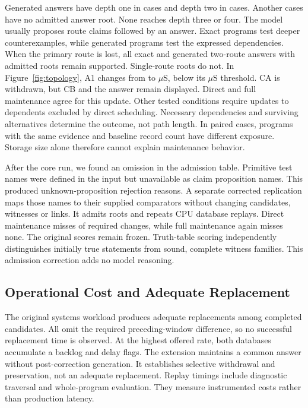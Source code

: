 Generated answers have depth one in \SemRootOne{} cases and depth two in
\SemRootTwo{} cases.
Another \SemMissingRoots{} cases have no admitted answer root. None reaches depth
three or four. The model usually proposes route claims followed by an answer.
Exact programs test deeper counterexamples, while generated programs test the
expressed dependencies. When the primary route is
lost, all \SemFixtureAlternative{} exact and \SemGeneratedAlternative{} generated
two-route answers with admitted roots remain supported. Single-route roots do not.
In Figure~\ref{fig:topology}, A1 changes from
\ViewRouteOld{} to \ViewRouteNew{} $\mu$S, below its \ViewRouteThreshold{} $\mu$S
threshold. CA is withdrawn, but CB and the answer remain displayed.
Direct and full maintenance agree for this update. Other tested conditions require updates to dependents excluded by direct scheduling.
Necessary dependencies and surviving alternatives determine the outcome, not path length. In \SemSameSize{} paired cases, programs with
the same evidence and baseline record count have different exposure.
Storage size alone therefore cannot explain maintenance behavior.

After the core run, we found an omission in the admission table. Primitive test
names were defined in the input but unavailable as claim proposition names.
This produced \SemUnknownPrimitive{} unknown-proposition rejection reasons.
A separate corrected replication maps those names to their supplied comparators
without changing candidates, witnesses or links. It admits \SemAliasRoots{} roots
and repeats \SemAliasCells{} CPU database replays. Direct maintenance misses
\SemAliasMissed{} of \SemAliasRequired{} required changes, while full maintenance
again misses none. The original scores remain frozen. Truth-table scoring independently distinguishes
initially true statements from sound, complete witness families. This admission
correction adds no model reasoning.

\subsection{Operational Cost and Adequate Replacement}

The original systems workload produces \SystemsAdequate{} adequate replacements
among \SystemsExplanations{} completed candidates. All omit the required preceding-window difference, so no successful
replacement time is observed. At the highest offered rate, both databases accumulate a backlog and
delay flags. The extension maintains a common answer without post-correction generation.
It establishes selective withdrawal and preservation, not an adequate replacement.
Replay timings include diagnostic traversal and whole-program evaluation.
They measure instrumented costs rather than production latency.
